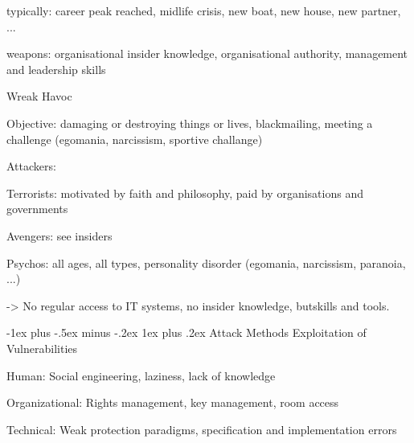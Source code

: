 \documentclass[a4paper]{article}
\makeatletter
\renewcommand{\subsubsection}{\@startsection{subsubsection}{3}{0mm}%
                                {-1ex plus -.5ex minus -.2ex}%
                                {1ex plus .2ex}%
                                {\normalfont\small\bfseries}}
\makeatother
\begin{document}
\begin{multicols}{3}
\begin{itemize*}
\begin{itemize*}
\begin{itemize*}
\begin{itemize*}
                                      \item typically: career peak reached, midlife crisis, new boat, new house, new partner, ...
                                      \item weapons: organisational insider knowledge, organisational authority, management and leadership skills
                                  \end{itemize*}
                        \end{itemize*}
              \end{itemize*}
        \item Wreak Havoc
              \begin{itemize*}
                  \item Objective: damaging or destroying things or lives, blackmailing, meeting a challenge (egomania, narcissism, sportive challange)
                  \item Attackers:
                        \begin{itemize*}
                            \item Terrorists: motivated by faith and philosophy, paid by organisations and governments
                            \item Avengers: see insiders
                            \item Psychos: all ages, all types, personality disorder (egomania, narcissism, paranoia, ...)
                            \item ->  No regular access to IT systems, no insider knowledge, butskills and tools.
                        \end{itemize*}
              \end{itemize*}
    \end{itemize*}

    \subsubsection{Attack Methods}
    Exploitation of Vulnerabilities
    \begin{itemize*}
        \item Human: Social engineering, laziness, lack of knowledge
        \item Organizational: Rights management, key management, room access
        \item Technical: Weak protection paradigms, specification and implementation errors
    \end{itemize*}


\end{multicols}
\end{document}
